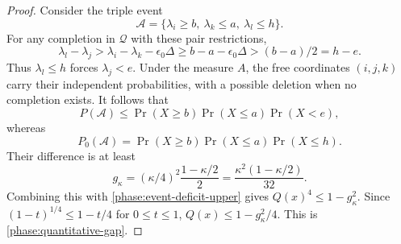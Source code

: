 \begin{proof}
Consider the triple event
\[
 \mathcal A=\{\lambda_i\ge b,\ \lambda_k\le a,\ \lambda_l\le h\}.
\]
For any completion in \(\mathcal Q\) with these pair restrictions,
\[
 \lambda_l-\lambda_j
 >\lambda_i-\lambda_k-\epsilon_0\Delta
 \ge b-a-\epsilon_0\Delta
 > (b-a)/2=h-e.
\]
Thus \(\lambda_l\le h\) forces \(\lambda_j<e\).  Under the measure
\(A\), the free coordinates \((i,j,k)\) carry their independent
probabilities, with a possible deletion when no completion exists.
It follows that
\[
 P(\mathcal A)
 \le \Pr(X\ge b)\Pr(X\le a)\Pr(X<e),
\]
whereas
\[
 P_0(\mathcal A)
 =\Pr(X\ge b)\Pr(X\le a)\Pr(X\le h).
\]
Their difference is at least
\[
 g_\kappa=
       (\kappa/4)^2\frac{1-\kappa/2}{2}
       =\frac{\kappa^2(1-\kappa/2)}{32}.
\]
Combining this with \eqref{phase:event-deficit-upper} gives
\(Q(x)^4\le1-g_\kappa^2\).  Since
\((1-t)^{1/4}\le1-t/4\) for \(0\le t\le1\),
\(Q(x)\le1-g_\kappa^2/4\).  This is
\eqref{phase:quantitative-gap}.
\end{proof}

